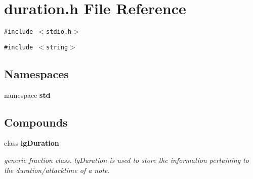 \section{duration.h File Reference}
\label{duration_8h}
{\tt \#include $<$stdio.h$>$}\par
{\tt \#include $<$string$>$}\par
\subsection*{Namespaces}
\begin{CompactItemize}
\item 
namespace {\bf std}
\end{CompactItemize}
\subsection*{Compounds}
\begin{CompactItemize}
\item 
class {\bf lg\-Duration}
\begin{CompactList}\small\item\em generic fraction class. lg\-Duration is used to store the information pertaining to the duration/attacktime of a note. \item\end{CompactList}\end{CompactItemize}
